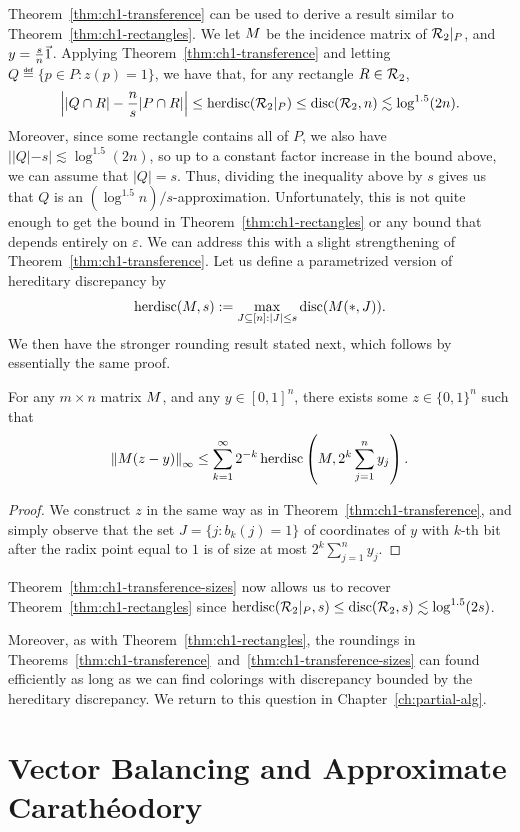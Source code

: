 Theorem~\ref{thm:ch1-transference} can be used to derive a result similar to Theorem~\ref{thm:ch1-rectangles}. We let $M$ be the incidence matrix of $\mathcal{R}_2|_P$, and $y = \frac{s}{n}\vec{1}$. Applying Theorem~\ref{thm:ch1-transference} and letting $Q\eqdef \{p \in P:z(p) = 1\}$, we have that, for any rectangle $R \in \mathcal{R}_2$,
\[
\left||Q\cap R| - \frac{n}{s}|P\cap R|\right| \le \operatorname{herdisc}(\mathcal{R}_2|_P) \le \operatorname{disc}(\mathcal{R}_2,n) \lesssim \log^{1.5}(2n).
\]
Moreover, since some rectangle contains all of $P$, we also have $||Q| - s| \lesssim \log^{1.5}(2n)$, so up to a constant factor increase in the bound above, we can assume that $|Q| = s$. Thus, dividing the inequality above by $s$ gives us that $Q$ is an $(\log^{1.5}n)/s$-approximation. Unfortunately, this is not quite enough to get the bound in Theorem~\ref{thm:ch1-rectangles} or any bound that depends entirely on $\varepsilon$. We can address this with a slight strengthening of Theorem~\ref{thm:ch1-transference}. Let us define a parametrized version of hereditary discrepancy by 
\[
\operatorname{herdisc}(M,s) := \max_{J\subseteq [n]: |J| \le s}\operatorname{disc}(M(*,J)).
\]
We then have the stronger rounding result stated next, which follows by essentially the same proof.
\begin{theorem}\label{thm:ch1-transference-sizes}
For any $m\times n$ matrix $M$, and any $y \in [0,1]^n$, there exists some $z \in \{0,1\}^n$ such that 
\[
    \left\|M(z-y)\right\|_\infty
    \le
    \sum_{k = 1}^\infty 2^{-k}\operatorname{herdisc}\left(M, 2^{k}\sum_{j = 1}^n y_j\right).
\]
\end{theorem}
\begin{proof}
    We construct $z$ in the same way as in Theorem~\ref{thm:ch1-transference}, and simply observe that the set $J = \{j: b_k(j) = 1\}$ of coordinates of $y$ with $k$-th bit after the radix point equal to $1$ is of size at most $2^k\sum_{j = 1}^n y_j$. 
\end{proof}
Theorem~\ref{thm:ch1-transference-sizes} now allows us to recover Theorem~\ref{thm:ch1-rectangles} since $\operatorname{herdisc}(\mathcal{R}_2|_P,s) \le \operatorname{disc}(\mathcal{R}_2,s) \lesssim \log^{1.5}(2s)$. 

Moreover, as with Theorem~\ref{thm:ch1-rectangles}, the roundings in Theorems~\ref{thm:ch1-transference}~and~\ref{thm:ch1-transference-sizes} can found efficiently as long as we can find colorings with discrepancy bounded by the hereditary discrepancy. We return to this question in Chapter~\ref{ch:partial-alg}. 

\section{Vector Balancing and Approximate Carath\'eodory}

